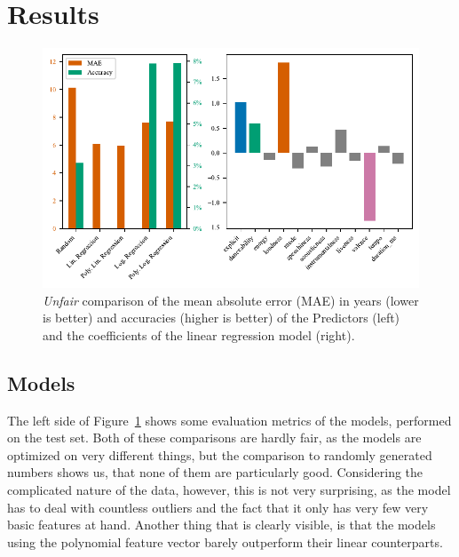 \documentclass{article}
\begin{document}
\section{Results}
\begin{figure}[t]
  \centering
  \includegraphics{losses_lincoefs}
  \caption{\emph{Unfair} comparison of the mean absolute error (MAE) in years (lower is better) and accuracies (higher is better) of the Predictors (left) and the coefficients of the linear regression model (right).}
  \label{fig:losses_lincoefs}
\end{figure}
\subsection{Models}

The left side of Figure~\ref{fig:losses_lincoefs} shows some evaluation metrics of the models, performed on the test set. 
Both of these comparisons are hardly fair, as the models are optimized on very different things, but the comparison to randomly generated numbers shows us, that none of them are particularly good. Considering the complicated nature of the data, however, this is not very surprising, as the model has to deal with countless outliers and the fact that it only has very few very basic features at hand.
Another thing that is clearly visible, is that the models using the polynomial feature vector barely outperform their linear counterparts.
\end{document}

